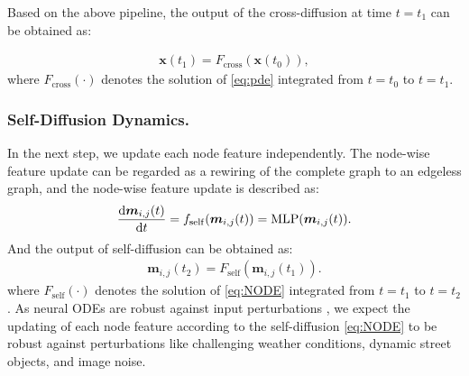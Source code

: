 \documentclass[letterpaper]{article} \usepackage{aaai23}  \usepackage{times}  \usepackage{helvet}  \usepackage{courier}  \usepackage[hyphens]{url}  \usepackage{graphicx} \urlstyle{rm} \def\UrlFont{\rm}  \usepackage{natbib}  \usepackage{caption} \frenchspacing  \setlength{\pdfpagewidth}{8.5in} \setlength{\pdfpageheight}{11in} \usepackage{booktabs}
\theoremstyle{remark}
\theoremstyle{plain}
\newcommand{\mbm}{\bm{m}}
\newcommand{\mbx}{\bm{x}}
\begin{document}
Based on the above pipeline, the output of the cross-diffusion at time $t=t_{1}$ can be obtained as:


\begin{align}
\mbx(t_{1})=F_{\mathrm{cross}}(\mbx(t_{0})),
\end{align}
where $F_{\mathrm{cross}}(\cdot)$ denotes the solution of \cref{eq:pde} integrated from $t=t_{0}$ to $t=t_{1}$. 

\subsubsection{Self-Diffusion Dynamics.} In the next step, we update each node feature independently. The node-wise feature update can be regarded as a rewiring of the complete graph to an edgeless graph, and the node-wise feature update is described as:
\begin{align}
\ddfrac{\mbm_{i,j}(t)}{t}=f_{\mathrm{self}}(\mbm_{i,j}(t))=\mathrm{MLP}(\mbm_{i,j}(t)).
\label{eq:NODE}
\end{align}And the output of self-diffusion can be obtained as:
\begin{align}
\mbm_{i,j}(t_{2})=F_{\mathrm{self}}(\mbm_{i,j}(t_{1})).
\end{align}
where $F_{\mathrm{self}}(\cdot)$ denotes the solution of \cref{eq:NODE} integrated from $t=t_{1}$ to $t=t_{2}$. 
As neural ODEs are robust against input perturbations  \cite{yan2019robustness,kang2021Neurips}, we expect the updating of each node feature according to the self-diffusion \cref{eq:NODE} to be robust against perturbations like challenging weather conditions, dynamic street objects, and image noise.
\end{document}
